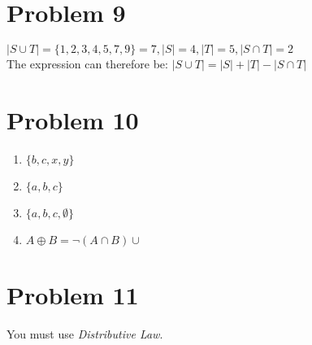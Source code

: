 \documentclass[english,10pt,a4paper]{article}
\begin{document}
\section*{Problem 9}
$|S \cup T| = \{1,2,3,4,5,7,9\} = 7, |S|=4, |T|=5, |S\cap T|=2$\\
The expression can therefore be: $|S \cup T| = |S|+|T|-|S\cap T|$


\section*{Problem 10}
\begin{enumerate}[a]
\item $\{b, c, x, y\}$
\item $\{a, b, c \}$
\item $\{a, b, c, \emptyset\}$
\item $A \oplus B = \neg(A \cap B) \cup $
\end{enumerate}



\section*{Problem 11}
You must use \textit{Distributive Law}.
\end{document}
